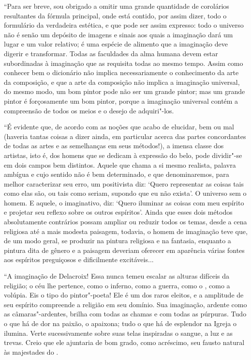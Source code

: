 “Para ser breve, sou obrigado a omitir uma grande quantidade de
corolários resultantes da fórmula principal, onde está contido, por
assim dizer, todo o formulário da verdadeira estética, e que pode ser
assim expresso: todo o universo não é senão um depósito de imagens e
sinais aos quais a imaginação dará um lugar e um valor relativo; é uma
espécie de alimento que a imaginação deve digerir e transformar. Todas
as faculdades da alma humana devem estar subordinadas à imaginação que
as requisita todas ao mesmo tempo. Assim como conhecer bem o dicionário
não implica necessariamente o conhecimento da arte da composição, e que
a arte da composição não implica a imaginação universal, do mesmo modo,
um bom pintor pode não ser um grande pintor; mas um grande pintor é
forçosamente um bom pintor, porque a imaginação universal contém a
compreensão de todos os meios e o desejo de adquiri"-los.

“É evidente que, de acordo com as noções que acabo de elucidar, bem ou
mal (haveria tantas coisas a dizer ainda, em particular acerca das
partes concordantes de todas as artes e as semelhanças em seus
métodos!), a imensa classe dos artistas, isto é, dos homens que se
dedicam à expressão do belo, pode dividir"-se em dois campos bem
distintos. Aquele que chama a si mesmo realista, palavra ambígua e cujo
sentido não é bem determinado, e que denominaremos, para melhor
caracterizar seu erro, um positivista diz: ‘Quero representar as coisas
tais como elas são, ou tais como seriam, supondo que eu não exista’. O
universo sem o homem. E aquele, o imaginativo, diz: ‘Quero iluminar as
coisas com meu espírito e projetar seu reflexo sobre os outros
espíritos’. Ainda que esses dois métodos absolutamente contrários
possam ampliar ou reduzir todos os temas, desde a cena religiosa até a
mais modesta paisagem, todavia, o homem de imaginação teve que, de um
modo geral, se produzir na pintura religiosa e na fantasia, enquanto a
pintura dita de gênero e a paisagem deveriam oferecer em aparência
várias fontes aos espíritos preguiçosos e dificilmente excitáveis...

“A imaginação de Delacroix! Essa nunca temeu escalar as alturas difíceis
da religião; o céu lhe pertence, como o inferno, como a guerra, como o
, como a volúpia. Eis o tipo do pintor"-poeta! Ele é um dos raros
eleitos, e a amplitude de seu espírito compreende a religião em seu
domínio. Sua imaginação, ardente como as câmaras"-ardentes, brilha com
todas as chamas e com todas as púrpuras. Tudo o que há de dor na
paixão, o apaixona; tudo o que há de esplendor na Igreja o ilumina.
Verte sucessivamente sobre suas telas inspiradas o sangue, a luz e as
trevas. Creio que ele ajuntaria de bom grado, como acréscimo, seu
fausto natural às majestades do .

